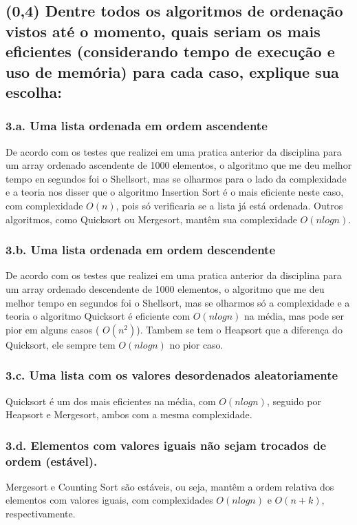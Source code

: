 \documentclass{article}
\begin{document}
\subsection {(0,4) Dentre todos os algoritmos de ordenação vistos até o momento, quais seriam os
mais eficientes (considerando tempo de execução e uso de memória) para cada caso,
explique sua escolha:}

\subsubsection {3.a. Uma lista ordenada em ordem ascendente}

De acordo com os testes que realizei em uma pratica anterior da disciplina para um array ordenado ascendente de 1000 elementos, o algoritmo que me deu melhor tempo en segundos foi o Shellsort, 
mas se olharmos para o lado da complexidade e a teoria nos disser que o algoritmo Insertion Sort é o mais eficiente neste caso, com complexidade 
$O(n)$, pois só verificaria se a lista já está ordenada. Outros algoritmos, como Quicksort ou Mergesort, mantêm sua complexidade 
$O(nlogn)$.



\subsubsection {3.b. Uma lista ordenada em ordem descendente}
De acordo com os testes que realizei em uma pratica anterior da disciplina para um array ordenado descendente de 1000 elementos, o algoritmo que me deu melhor tempo en segundos foi o Shellsort, 
mas se olharmos só a complexidade e a teoria o algoritmo
Quicksort é eficiente com $O(nlogn)$ na média, mas pode ser pior em alguns casos (
$O(n^2)$). Tambem se tem o Heapsort que a diferença do Quicksort, ele sempre tem $O(nlogn)$ no pior caso.

\subsubsection {3.c. Uma lista com os valores desordenados aleatoriamente}

Quicksort é um dos mais eficientes na média, com $O(nlogn)$, seguido por Heapsort e Mergesort, ambos com a mesma complexidade.

\subsubsection {3.d. Elementos com valores iguais não sejam trocados de ordem (estável).}

Mergesort e Counting Sort são estáveis, ou seja, mantêm a ordem relativa dos elementos com valores iguais, com complexidades 
$O(nlogn)$ e $O(n+k)$, respectivamente.
\end{document}
